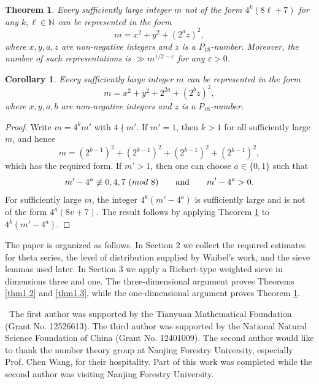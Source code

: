 \documentclass[10pt,a4paper]{amsart}
\numberwithin{equation}{section}
\def\pmod #1{\ ({\rm{mod}}\ #1)}
\def\Ack{\medskip\noindent {\bf Acknowledgments}}
\newtheorem{theorem}{Theorem}
\newtheorem{corollary}{Corollary}
\begin{document}
\begin{theorem}\label{thm1.1}
Every sufficiently large integer $m$ not of the form $4^k(8\ell + 7)$ for any $k,\ell\in\mathbb{N}$ can be represented in the form
\[
m = x^2 + y^2 + (2^a z)^2,
\]
where $x,y,a,z$ are non-negative integers and $z$ is a $P_{18}$-number. Moreover, the number of such representations is $\gg m^{1/2-\varepsilon}$ for any $\varepsilon>0$.
\end{theorem}

\begin{corollary}\label{cor1.2}
Every sufficiently large integer $m$ can be represented in the form
\[
m = x^2 + y^2 + 2^{2a} + (2^b z)^2,
\]
where $x, y, a, b$ are non-negative integers and $z$ is a $P_{18}$-number.
\end{corollary}
\begin{proof}
Write $m=4^k m'$ with $4\nmid m'$. If $m'=1$, then $k>1$ for all sufficiently large $m$, and hence
\[
m=(2^{k-1})^2+(2^{k-1})^2+(2^{k-1})^2+(2^{k-1})^2,
\]
which has the required form. If $m'>1$, then one can choose $a\in\{0,1\}$ such that
\[
m'-4^a\not\equiv0,4,7\pmod 8
\qquad\text{and}\qquad
m'-4^a>0.
\]
For sufficiently large $m$, the integer $4^k(m'-4^a)$ is sufficiently large and is not of the form $4^u(8v+7)$. The result follows by applying Theorem \ref{thm1.1} to $4^k(m'-4^a)$.
\end{proof}

The paper is organized as follows. In Section 2 we collect the required estimates for theta series, the level of distribution supplied by Waibel's work, and the sieve lemmas used later. In Section 3 we apply a Richert-type weighted sieve in dimensions three and one. The three-dimensional argument proves Theorems \ref{thm1.2} and \ref{thm1.3}, while the one-dimensional argument proves Theorem \ref{thm1.1}.

\Ack\ The first author was supported by the Tianyuan Mathematical Foundation (Grant No. 12526613). The third author was supported by the National Natural Science Foundation of China (Grant No. 12401009). The second author would like to thank the number theory group at Nanjing Forestry University, especially Prof. Chen Wang, for their hospitality. Part of this work was completed while the second author was visiting Nanjing Forestry University.
\end{document}
